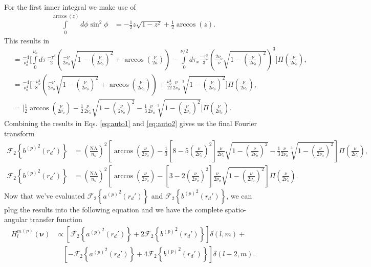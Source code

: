 \documentclass[11pt]{article}
\providecommand{\bs}[1]{\boldsymbol{#1}}
\begin{document}
For the first inner integral we make use of
\begin{align}
  \int\limits_0^{\arccos(z)} d\phi \sin^2\phi &= -\frac{1}{2}z\sqrt{1 - z^2} + \frac{1}{2}\arccos(z).
\end{align}
This results in
\begin{align}
  &=\frac{-4}{\nu_o^4}\Bigg[\int\limits_0^{\nu_o} d\tau\, \frac{-\tau^3}{2}\left(\frac{-\nu}{2\nu_o}\sqrt{1 - \left(\frac{\nu}{2\nu_o}\right)^2} + \arccos\left(\frac{\nu}{2a}\right)\right) - \int\limits_0^{\nu/2}d\tau_x \frac{-\tau_x^3}{3}\left(\frac{2 \nu_o}{\nu}\sqrt{1 - \left(\frac{\nu}{2\nu_o}\right)^2}\right)^3\Bigg]\Pi\left(\frac{\nu}{2\nu_o}\right),\\
  &=  \frac{-4}{\nu_o^4}\Bigg[\frac{-\nu_o^4}{8}\left(\frac{-\nu}{2\nu_o}\sqrt{1 - \left(\frac{\nu}{2\nu_o}\right)^2} + \arccos\left(\frac{\nu}{2\nu_o}\right) \right) + \frac{\nu_o^4}{12}\frac{\nu}{2\nu_o}\sqrt[3]{1 - \left(\frac{\nu}{2\nu_o}\right)^2}\Bigg]\Pi\left(\frac{\nu}{2\nu_o}\right),\\
  &=  \Bigg[\frac{1}{2}\arccos\left(\frac{\nu}{2\nu_o}\right) - \frac{1}{2}\frac{\nu}{2\nu_o}\sqrt{1 - \left(\frac{\nu}{2\nu_o}\right)^2} - \frac{1}{3}\frac{\nu}{2\nu_o}\sqrt[3]{1 - \left(\frac{\nu}{2\nu_o}\right)^2}\Bigg]\Pi\left(\frac{\nu}{2\nu_o}\right). \label{eq:auto2}
\end{align}
Combining the results in Eqs. \ref{eq:auto1} and \ref{eq:auto2} gives us the final Fourier transform
\begin{align}
  \mathcal{F}_2\left\{{b^{(p)}}^2(r_d')\right\} &= \left(\frac{\text{NA}}{n_o}\right)^2\left[\arccos\left(\frac{\nu}{2\nu_o}\right) - \frac{1}{3}\left[8 - 5\left(\frac{\nu}{2\nu_o}\right)^2\right]\frac{\nu}{2\nu_o} \sqrt{1 - \left(\frac{\nu}{2\nu_o}\right)^2} - \frac{1}{3}\frac{\nu}{2\nu_o}\sqrt[3]{1 - \left(\frac{\nu}{2\nu_o}\right)^2}\right]\Pi\left(\frac{\nu}{2\nu_o}\right),\\
    \mathcal{F}_2\left\{{b^{(p)}}^2(r_d')\right\} &= \left(\frac{\text{NA}}{n_o}\right)^2\left[\arccos\left(\frac{\nu}{2\nu_o}\right) - \left[3 - 2\left(\frac{\nu}{2\nu_o}\right)^2\right]\frac{\nu}{2\nu_o} \sqrt{1 - \left(\frac{\nu}{2\nu_o}\right)^2}\right]\Pi\left(\frac{\nu}{2\nu_o}\right).
\end{align}
Now that we've evaluated $\mathcal{F}_2\left\{{a^{(p)}}^2(r_d')\right\}$ and $\mathcal{F}_2\left\{{b^{(p)}}^2(r_d')\right\}$, we can plug the results into the following equation and we have the complete spatio-angular transfer function
\begin{align}
  {H_l^m}^{(p)}(\bs{\nu}) &\propto \left[\mathcal{F}_2\left\{{a^{(p)}}^2(r_d')\right\} + 2\mathcal{F}_2\left\{{b^{(p)}}^2(r_d')\right\}\right]\delta(l, m) + \\&\hspace{1em}\left[-\mathcal{F}_2\left\{{a^{(p)}}^2(r_d')\right\} + 4\mathcal{F}_2\left\{{b^{(p)}}^2(r_d')\right\}\right]\delta(l-2, m).
\end{align}
\end{document}
